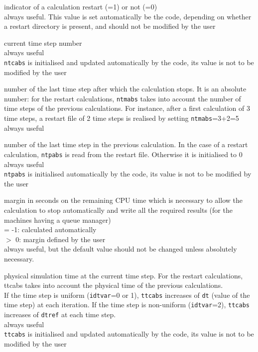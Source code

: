 {indicator of a calculation restart (=1) or not (=0)\\
always useful. This value is set automatically be the code, depending on
whether a restart directory is present, and should not be modified by
the user}

{current time step number\\
always useful\\
{\tt ntcabs} is initialised and updated automatically by the code,
its value is not to be modified by the user}

{number of the last time step after which the calculation stops. It is
an absolute number: for the restart calculations, {\tt ntmabs} takes into
account the number of time steps of the previous calculations. For
instance, after a first calculation of 3 time steps, a restart file of 2
time steps is realised by setting {\tt ntmabs}=3+2=5\\
always useful}

{number of the last time step in the previous calculation. In the case of
a restart calculation, {\tt ntpabs} is read from the restart file. Otherwise
it is initialised to 0\\
always useful\\
{\tt ntpabs} is initialised automatically by the code, its value is not to
be modified by the user}

{margin in seconds on the remaining CPU time which is necessary to allow
the calculation to stop automatically and write all the required results
(for the machines having a queue manager)\\
\hspace*{1.3cm}= -1: calculated automatically\\
\hspace*{1.3cm}$>$ 0: margin defined by the user\\
always useful, but the default value should not be changed
unless absolutely necessary.}


{physical simulation time at the current time step. For the restart
calculations, \mbox{ttcabs} takes into account the physical time of the
previous calculations.\\
If the time step is uniform ({\tt idtvar}=0 or 1), {\tt ttcabs} increases
of {\tt dt} (value of the time step) at each iteration. If the time step is
non-uniform ({\tt idtvar}=2),
{\tt ttcabs} increases of {\tt dtref} at each time step.\\
always useful\\
{\tt ttcabs} is initialised and updated automatically by the code,
its value is not to be modified by the user}

